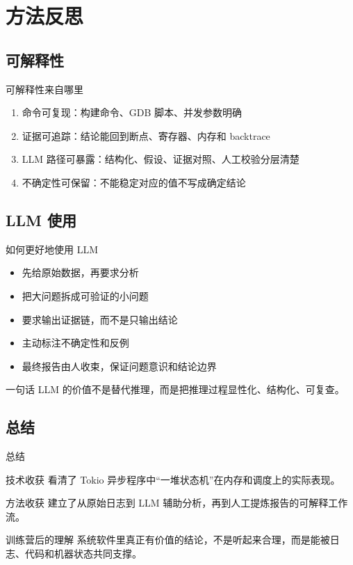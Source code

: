 \documentclass[aspectratio=169,11pt]{beamer}
\begin{document}
\section{方法反思}
\subsection{可解释性}

\begin{frame}{可解释性来自哪里}
  \begin{enumerate}
    \item 命令可复现：构建命令、GDB 脚本、并发参数明确
    \item 证据可追踪：结论能回到断点、寄存器、内存和 backtrace
    \item LLM 路径可暴露：结构化、假设、证据对照、人工校验分层清楚
    \item 不确定性可保留：不能稳定对应的值不写成确定结论
  \end{enumerate}
\end{frame}

\subsection{LLM 使用}

\begin{frame}{如何更好地使用 LLM}
  \begin{itemize}
    \item 先给原始数据，再要求分析
    \item 把大问题拆成可验证的小问题
    \item 要求输出证据链，而不是只输出结论
    \item 主动标注不确定性和反例
    \item 最终报告由人收束，保证问题意识和结论边界
  \end{itemize}

  \vspace{0.7em}
  \begin{alertblock}{一句话}
    LLM 的价值不是替代推理，而是把推理过程显性化、结构化、可复查。
  \end{alertblock}
\end{frame}

\subsection{总结}

\begin{frame}{总结}
  \begin{block}{技术收获}
    看清了 Tokio 异步程序中“一堆状态机”在内存和调度上的实际表现。
  \end{block}

  \begin{block}{方法收获}
    建立了从原始日志到 LLM 辅助分析，再到人工提炼报告的可解释工作流。
  \end{block}

  \begin{alertblock}{训练营后的理解}
    系统软件里真正有价值的结论，不是听起来合理，而是能被日志、代码和机器状态共同支撑。
  \end{alertblock}
\end{frame}
\end{document}
